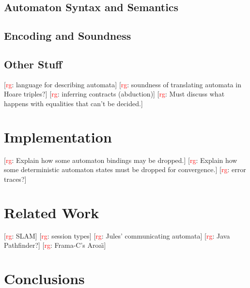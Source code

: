 \documentclass[a4paper]{article}
\newcommand{\todo}[2]{{\small [\textcolor{red}{#1}: #2]}}
\newcommand{\rg}[1]{\todo{rg}{#1}}
\theoremstyle{remark}
\begin{document}
\subsection{Automaton Syntax and Semantics} %

\subsection{Encoding and Soundness} %

\subsection{Other Stuff} %

\rg{language for describing automata}
\rg{soundness of translating automata in Hoare triples?}
\rg{inferring contracts (abduction)}
\rg{Must discuss what happens with equalities that can't be decided.}

\section{Implementation} %

\rg{Explain how some automaton bindings may be dropped.}
\rg{Explain how some deterministic automaton states must be dropped for convergence.}
\rg{error traces?}

\section{Related Work} %

\rg{SLAM}
\rg{session types}
\rg{Jules' communicating automata}
\rg{Java Pathfinder?}
\rg{Frama-C's Aroa\"\i}

\section{Conclusions} %



\end{document}
